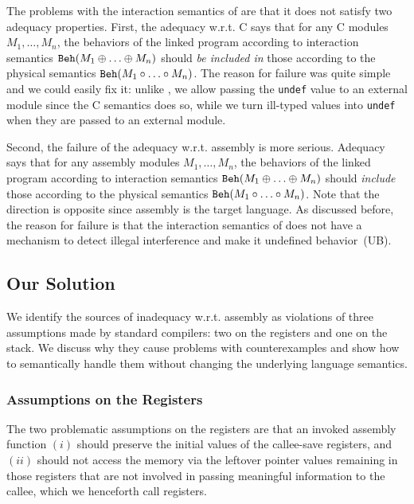 The problems with the interaction semantics of \ccc{} are that it does
not satisfy two adequacy properties. First, the adequacy w.r.t. C says
that for any C modules $M_1,\ldots,M_n$, the behaviors of the linked
program according to interaction semantics $\mathtt{Beh}({M_1 \oplus
  \ldots \oplus M_n})$ should \emph{be included in} those according to the
physical semantics $\mathtt{Beh}({M_1 \circ \ldots\circ M_n})$.  The reason for
failure was quite simple and we could easily fix it: unlike \ccc{}, we allow passing
the \texttt{undef} value to an external module since the C semantics
does so, while we turn ill-typed values into \texttt{undef} when they
are passed to an external module.

Second, the failure of the adequacy w.r.t. assembly is more serious.
Adequacy says that for any assembly modules $M_1,\ldots,M_n$,
the behaviors of the linked program according to interaction
semantics $\mathtt{Beh}({M_1 \oplus \ldots \oplus M_n})$ should \emph{include}
those according to the physical semantics $\mathtt{Beh}({M_1 \circ \ldots\circ M_n})$.
Note that the direction is opposite since assembly is the target language.
As discussed before, the reason for failure is that
the interaction semantics of \ccc{} does not have a mechanism to detect
illegal interference and make it undefined behavior~(UB).

\subsection{Our Solution}
\label{sec:overview-semantics:solution}

We identify the sources of inadequacy w.r.t. assembly as violations of
three assumptions made by standard compilers: two on the registers and one on the stack.
We discuss why they 
cause problems with counterexamples and show how to semantically
handle them without changing the underlying language semantics.

\subsubsection{Assumptions on the Registers}
\label{sec:overview-semantics-register}
%
The two problematic assumptions on the registers are that
an invoked assembly function $(i)$ should
preserve the initial values of the callee-save registers, and $(ii)$
should not access the memory via the leftover pointer values remaining
in those registers that are not involved in passing meaningful information to the callee,
which we henceforth call \emph{\nip{}} registers.

